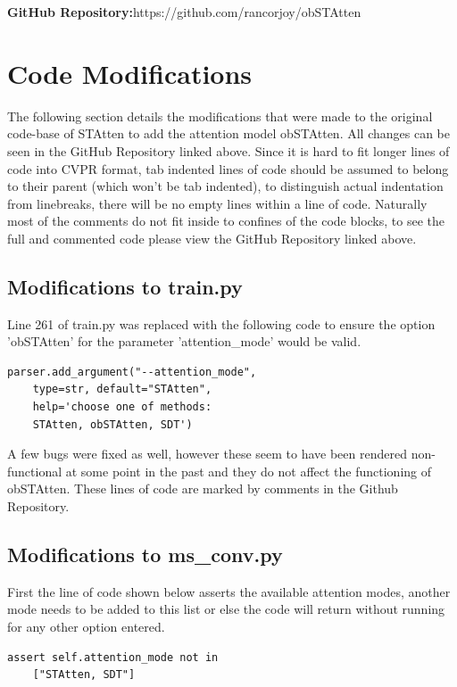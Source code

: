 \documentclass[../main.tex]{subfiles}
\begin{document}
\clearpage
\setcounter{page}{1}
\maketitlesupplementary

\noindent\textbf{GitHub Repository:}https://github.com/rancorjoy/obSTAtten\\

\section{Code Modifications}
The following section details the modifications that were made to the original code-base of STAtten to add the attention model obSTAtten. All changes can be seen in the GitHub Repository linked above. Since it is hard to fit longer lines of code into CVPR format, tab indented lines of code should be assumed to belong to their parent (which won't be tab indented), to distinguish actual indentation from linebreaks, there will be no empty lines within a line of code. Naturally most of the comments do not fit inside to confines of the code blocks, to see the full and commented code please view the GitHub Repository linked above.

\subsection{Modifications to train.py}
Line 261 of train.py was replaced with the following code to ensure the option 'obSTAtten' for the parameter 'attention\_mode' would be valid.

\begin{verbatim}
parser.add_argument("--attention_mode",
	type=str, default="STAtten",
	help='choose one of methods:
   	STAtten, obSTAtten, SDT')    
\end{verbatim}

\noindent A few bugs were fixed as well, however these seem to have been rendered non-functional at some point in the past and they do not affect the functioning of obSTAtten. These lines of code are marked by comments in the Github Repository.

\subsection{Modifications to ms\_conv.py}
First the line of code shown below asserts the available attention modes, another mode needs to be added to this list or else the code will return without running for any other option entered.
\begin{verbatim}
assert self.attention_mode not in 
	["STAtten, SDT"]   
\end{verbatim}
\end{document}

